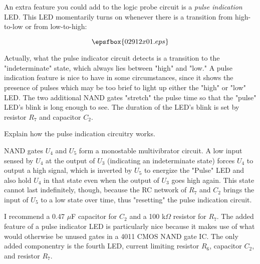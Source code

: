 

An extra feature you could add to the logic probe circuit is a {\it pulse indication} LED.  This LED momentarily turns on whenever there is a transition from high-to-low or from low-to-high:

$$\epsfbox{02912x01.eps}$$

Actually, what the pulse indicator circuit detects is a transition to the "indeterminate" state, which always lies between "high" and "low."  A pulse indication feature is nice to have in some circumstances, since it shows the presence of pulses which may be too brief to light up either the "high" or "low" LED.  The two additional NAND gates "stretch" the pulse time so that the "pulse" LED's blink is long enough to see.  The duration of the LED's blink is set by resistor $R_7$ and capacitor $C_2$.

Explain how the pulse indication circuitry works.







NAND gates $U_4$ and $U_5$ form a monostable multivibrator circuit.  A low input sensed by $U_4$ at the output of $U_3$ (indicating an indeterminate state) forces $U_4$ to output a high signal, which is inverted by $U_5$ to energize the "Pulse" LED and also hold $U_4$ in that state even when the output of $U_3$ goes high again.  This state cannot last indefinitely, though, because the RC network of $R_7$ and $C_2$ brings the input of $U_5$ to a low state over time, thus "resetting" the pulse indication circuit.







I recommend a 0.47 $\mu$F capacitor for $C_2$ and a 100 k$\Omega$ resistor for $R_7$.  The added feature of a pulse indicator LED is particularly nice because it makes use of what would otherwise be unused gates in a 4011 CMOS NAND gate IC.  The only added componentry is the fourth LED, current limiting resistor $R_6$, capacitor $C_2$, and resistor $R_7$.



